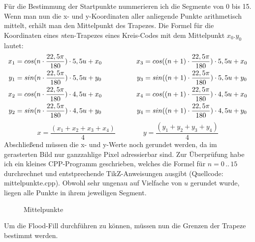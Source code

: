	Für die Bestimmung der Startpunkte nummerieren ich die Segmente von 0 bis 15. Wenn man nun die x- und y-Koordinaten aller anliegende Punkte arithmetisch mittelt, erhält man den Mittelpunkt des Trapezes. Die Formel für die Koordinaten eines \textit{n}ten-Trapezes eines Kreis-Codes mit dem Mittelpunkt \(x_0 . y_0\) lautet:
	\begin{gather}
	\begin{split}
		x_1 &= cos(n \cdot \frac{22,5\pi}{180}) \cdot 5,5u + x_0\\
		y_1 &= sin(n \cdot \frac{22,5\pi}{180}) \cdot 5,5u + y_0\\ \vspace{2em}
		x_2 &= cos(n \cdot \frac{22,5\pi}{180}) \cdot 4,5u + x_0\\
		y_2 &= sin(n \cdot \frac{22,5\pi}{180}) \cdot 4,5u + y_0
	\end{split}
	\hspace{5em}
	\begin{split}
		x_3 &= cos((n+1) \cdot \frac{22,5\pi}{180}) \cdot 5,5u + x_0\\
		y_3 &= sin((n+1) \cdot \frac{22,5\pi}{180}) \cdot 5,5u + y_0 \\ \vspace{2em}
		x_4 &= cos((n+1) \cdot \frac{22,5\pi}{180}) \cdot 4,5u + x_0\\
		y_4 &= sin((n+1) \cdot \frac{22,5\pi}{180}) \cdot 4,5u + y_0
	\end{split} \label{eq:nKoords}
	\end{gather}
	\begin{equation}
	x = \frac{(x_1+x_2+x_3+x_4)}{4} \hspace{4em} y = \frac{(y_1+y_2+y_3+y_4)}{4}
	\end{equation}
	Abschließend müssen die x- und y-Werte noch gerundet werden, da im gerasterten Bild nur ganzzahlige Pixel adressierbar sind.
	Zur Überprüfung habe ich ein kleines CPP-Programm geschrieben, welches die Formel für \(n = 0\hspace{2pt}..\hspace{2pt}15 \) durchrechnet und entstprechende TikZ-Anweisungen ausgibt (Quellcode: mittelpunkte.cpp). Obwohl sehr ungenau auf Vielfache von \(u\) gerundet wurde, liegen alle Punkte in ihrem jeweiligen Segment.
	\begin{figure}[!ht]
		\centering
		
		\caption{Mittelpunkte}
	\end{figure}

	Um die Flood-Fill durchführen zu können, müssen nun die Grenzen der Trapeze bestimmt werden. 

